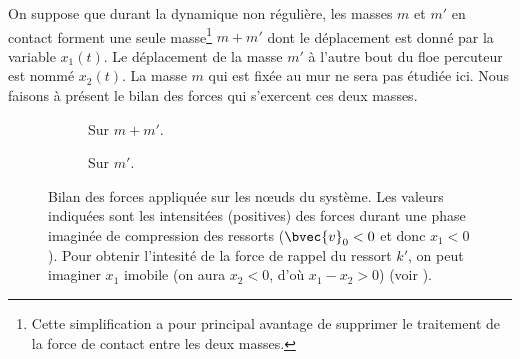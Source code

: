 \noindent On suppose que durant la dynamique non régulière, les masses $m$ et $m'$ en contact forment une seule masse\footnote{Cette simplification a pour principal avantage de supprimer le traitement de la force de contact entre les deux masses.}
$m+m'$ dont
le déplacement est donné par la variable $x_1(t)$. Le déplacement de la masse $m'$ à l'autre bout du floe percuteur est nommé
$x_2(t)$. La masse $m$ qui est fixée au mur ne sera pas étudiée ici. Nous faisons à présent le bilan des forces qui
s'exercent ces
deux masses.
\begin{figure}[!h]
     \begin{subfigure}[b]{0.4\textwidth}
         \centering
         \caption{Sur $m+m'$.}
         \label{fig:bilan11}
     \end{subfigure}
     \begin{subfigure}[b]{0.3\textwidth}
         \centering
         \caption{Sur $m'$.}
         \label{fig:bilan12}
     \end{subfigure}
        \caption{Bilan des forces appliquée sur les n\oe{}uds du système. Les valeurs indiquées sont les intensitées
            (positives) des forces durant une phase imaginée de compression des ressorts ($\bvec{v}_0 <0$ et donc
            $x_1 <0$). Pour obtenir l'intesité de la force de rappel du ressort $k'$, on peut imaginer $x_1$ imobile
            (on aura $x_2 < 0$, d'où $x_1 - x_2 > 0$) (voir \parencite{homodeling}).}
        \label{fig:bilan}
\end{figure}

